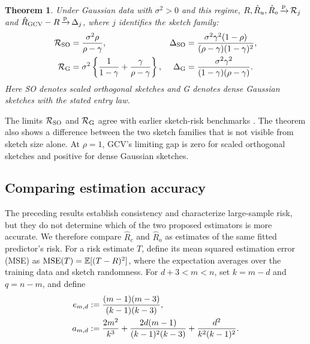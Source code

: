 \documentclass{article}
\theoremstyle{plain} %
\newtheorem{theorem}{Theorem}[section]
\theoremstyle{definition} %
\theoremstyle{definition} %
\newcommand{\GCV}{{\text{GCV}}}
\newcommand{\hR}{\hat{R}}
\begin{document}
\begin{theorem}
\label{thm:cpal-risk-benchmarks}
Under Gaussian data with $\sigma^2>0$ and this regime,
$R,\hR_u,\hR_o\limp\calR_j$ and $\hR_{\GCV}-R\limp\Delta_j$, where
$j$ identifies the sketch family:
\begin{align}
 {\mathcal R}_{\rm SO}&=\frac{\sigma^2\rho}{\rho-\gamma},&
 \Delta_{\rm SO}&=
 \frac{\sigma^2\gamma^2(1-\rho)}
 {(\rho-\gamma)(1-\gamma)^2},\notag\\
 {\mathcal R}_{\rm G}&=\sigma^2\left\{\frac1{1-\gamma}
                    +\frac{\gamma}{\rho-\gamma}\right\},&
 \Delta_{\rm G}&=\frac{\sigma^2\gamma^2}
 {(1-\gamma)(\rho-\gamma)}.
 \label{eq:cpal-risk-benchmarks}
\end{align}
Here SO denotes scaled orthogonal sketches and G denotes dense Gaussian sketches
with the stated entry law.
\end{theorem}

The limits ${\mathcal R}_{\rm SO}$ and ${\mathcal R}_{\rm G}$ agree with earlier sketch-risk benchmarks \citep{dobriban2019asymptotics,chen2023sketched}. The theorem also shows a difference between the two sketch families that is not visible from sketch size alone. At $\rho=1$, GCV's limiting gap is zero for scaled orthogonal sketches and positive for dense Gaussian sketches.

\subsection{Comparing estimation accuracy}

The preceding results establish consistency and characterize large-sample risk, but they do not determine which of the two proposed estimators is more accurate. We therefore compare $\widehat R_c$ and $\hR_o$ as estimates of the same fitted predictor's risk. For a risk estimate $T$, define its mean squared estimation error (MSE) as $\operatorname{MSE}(T)={\mathbb{E}}[(T-R)^2]$, where the expectation averages over the training data and sketch randomness. For $d+3<m<n$, set $k=m-d$ and $q=n-m$, and define
\begin{align*}
   e_{m,d}&:=\frac{(m-1)(m-3)}{(k-1)(k-3)}, \notag\\
   a_{m,d}&:=\frac{2m^2}{k^3}
     +\frac{2d(m-1)}{(k-1)^2(k-3)}
     +\frac{d^2}{k^2(k-1)^2}.
\end{align*}
\end{document}
